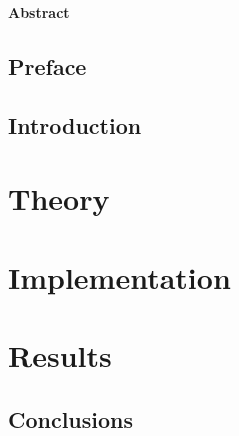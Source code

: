 \documentclass[11pt,a4paper]{book}
\numberwithin{equation}{section}
\let\origdoublepage\cleardoublepage
\newcommand{\clearemptydoublepage}{%
  \clearpage
  {\pagestyle{empty}\origdoublepage}%
}
\let\cleardoublepage\clearemptydoublepage
\begin{document}
 

\clearemptydoublepage

\vspace*{\fill}
\thispagestyle{empty}
\begin{center}
\textbf{Abstract}
\end{center}

\vspace*{\fill}

\chapter*{Preface}


\doublespacing
\tableofcontents
\singlespacing
 
\chapter{Introduction}

 

\part{Theory} 

 
\part{Implementation}


\part{Results}


\chapter{Conclusions}\label{sec: Conclusions}




\newpage\thispagestyle{empty}
\begin{changemargin}{0 cm}{4 cm}

\end{changemargin}

 
\end{document}
